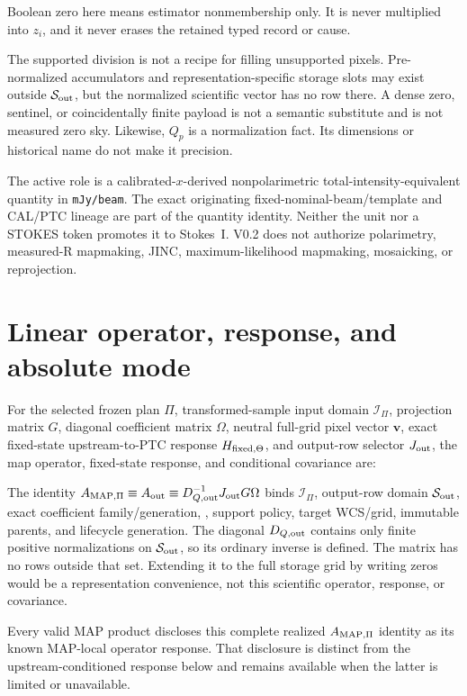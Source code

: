 \documentclass[10pt]{article}
\newcommand{\code}[1]{\nolinkurl{#1}}
\begin{document}
Boolean zero here means estimator nonmembership only. It is never multiplied
into \(z_i\), and it never erases the retained typed record or cause.

The supported division is not a recipe for filling unsupported pixels.
Pre-normalized accumulators and representation-specific storage slots may exist outside
\(\mathcal S_{\rm out}\), but the normalized scientific vector has no row
there. A dense zero, sentinel, or coincidentally finite payload is not a
semantic substitute and is not measured zero sky. Likewise, \(Q_p\) is a
normalization fact. Its dimensions or historical name do not make it
precision.

The active role is a calibrated-\(x\)-derived nonpolarimetric
total-intensity-equivalent quantity in \code{mJy/beam}. The exact originating
fixed-nominal-beam/template and CAL/PTC lineage are part of the quantity
identity. Neither the unit nor a STOKES token promotes it to Stokes~I. V0.2
does not authorize polarimetry, measured-R mapmaking, JINC,
maximum-likelihood mapmaking, mosaicking, or reprojection.

\clearpage
\section{Linear operator, response, and absolute mode}

For the selected frozen plan \(\Pi\), transformed-sample input domain
\(\mathcal I_\Pi\), projection matrix \(G\), diagonal coefficient matrix
\(\Omega\), neutral full-grid pixel vector \(\boldsymbol v\), exact fixed-state
upstream-to-PTC response \(H_{{\rm fixed},\Theta}\), and output-row selector
\(J_{\rm out}\), the map operator, fixed-state response, and conditional
covariance are:

\SCIMapOperatorEquations

The identity \(A_{{\rm MAP},\Pi}\equiv A_{\rm out}\equiv
D_{Q,{\rm out}}^{-1}J_{\rm out}G\Omega\) binds \(\mathcal I_\Pi\), output-row
domain \(\mathcal S_{\rm out}\), exact coefficient family/generation,
\SCIMapOneHotProfile, support policy, target WCS/grid,
immutable parents, and lifecycle generation. The diagonal
\(D_{Q,{\rm out}}\) contains only finite positive normalizations
on \(\mathcal S_{\rm out}\), so its ordinary inverse is defined. The matrix
has no rows outside that set. Extending it to the full storage
grid by writing zeros would be a representation convenience, not this
scientific operator, response, or covariance.

Every valid MAP product discloses this complete realized
\(A_{{\rm MAP},\Pi}\) identity as its known MAP-local operator response.
That disclosure is distinct from the upstream-conditioned response below and
remains available when the latter is limited or unavailable.
\end{document}
